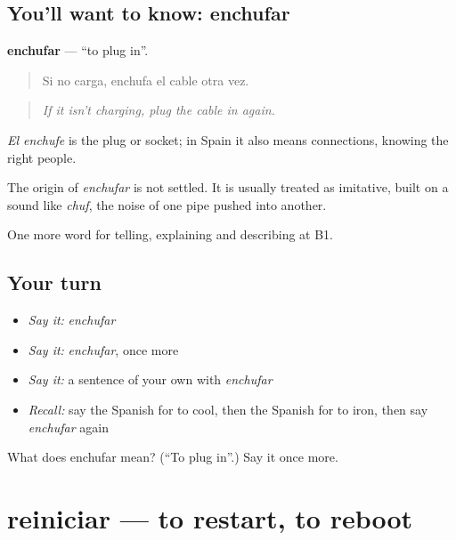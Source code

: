 \subsection*{You'll want to know: enchufar}
\textbf{enchufar} — \textquotedblleft{}to plug in\textquotedblright{}.

\begin{quote}
Si no carga, enchufa el cable otra vez.
\end{quote}

\begin{quote}
\emph{If it isn't charging, plug the cable in again.}
\end{quote}

\emph{El enchufe} is the plug or socket; in Spain it also means connections, knowing the right people.

\begin{cousinweb}
The origin of \emph{enchufar} is not settled. It is usually treated as imitative, built on a sound like \emph{chuf}, the noise of one pipe pushed into another.
\end{cousinweb}

\begin{grammarlens}[title={What you've built}]
One more word for telling, explaining and describing at B1.
\end{grammarlens}

\subsection*{Your turn}
\begin{itemize}
\raggedright
  \item \emph{Say it:} \emph{enchufar}
  \item \emph{Say it:} \emph{enchufar}, once more
  \item \emph{Say it:} a sentence of your own with \emph{enchufar}
  \item \emph{Recall:} say the Spanish for to cool, then the Spanish for to iron, then say \emph{enchufar} again
\end{itemize}

\begin{tcolorbox}[breakable,colback=teal!4,colframe=teal!35!black,title={Before you move on}]
What does enchufar mean? (\textquotedblleft{}To plug in\textquotedblright{}.) Say it once more.
\end{tcolorbox}
\section[reiniciar]{reiniciar — to restart, to reboot}

